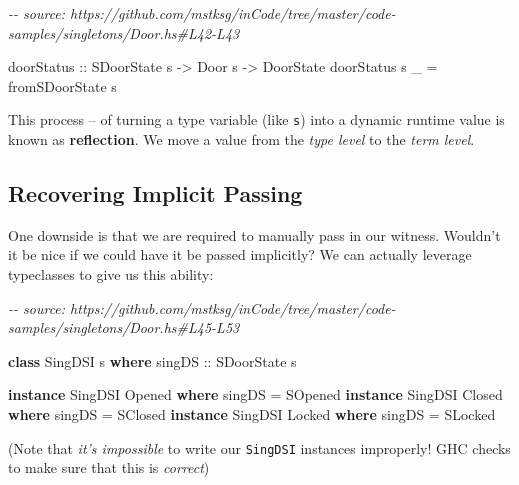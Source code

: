 \documentclass[]{article}
\newenvironment{Shaded}{}{}
\newcommand{\CommentTok}[1]{\textcolor[rgb]{0.38,0.63,0.69}{\textit{#1}}}
\newcommand{\DataTypeTok}[1]{\textcolor[rgb]{0.56,0.13,0.00}{#1}}
\newcommand{\KeywordTok}[1]{\textcolor[rgb]{0.00,0.44,0.13}{\textbf{#1}}}
\newcommand{\NormalTok}[1]{#1}
\newcommand{\OtherTok}[1]{\textcolor[rgb]{0.00,0.44,0.13}{#1}}
\begin{document}
\begin{Shaded}
\begin{Highlighting}[]
\CommentTok{{-}{-} source: https://github.com/mstksg/inCode/tree/master/code{-}samples/singletons/Door.hs\#L42{-}L43}

\OtherTok{doorStatus ::} \DataTypeTok{SDoorState}\NormalTok{ s }\OtherTok{{-}>} \DataTypeTok{Door}\NormalTok{ s }\OtherTok{{-}>} \DataTypeTok{DoorState}
\NormalTok{doorStatus s \_ }\OtherTok{=}\NormalTok{ fromSDoorState s}
\end{Highlighting}
\end{Shaded}

This process -- of turning a type variable (like \texttt{s}) into a dynamic
runtime value is known as \textbf{reflection}. We move a value from the
\emph{type level} to the \emph{term level}.

\hypertarget{recovering-implicit-passing}{%
\subsection{Recovering Implicit Passing}\label{recovering-implicit-passing}}

One downside is that we are required to manually pass in our witness. Wouldn't
it be nice if we could have it be passed implicitly? We can actually leverage
typeclasses to give us this ability:

\begin{Shaded}
\begin{Highlighting}[]
\CommentTok{{-}{-} source: https://github.com/mstksg/inCode/tree/master/code{-}samples/singletons/Door.hs\#L45{-}L53}

\KeywordTok{class} \DataTypeTok{SingDSI}\NormalTok{ s }\KeywordTok{where}
\OtherTok{    singDS ::} \DataTypeTok{SDoorState}\NormalTok{ s}

\KeywordTok{instance} \DataTypeTok{SingDSI} \DataTypeTok{\textquotesingle{}Opened} \KeywordTok{where}
\NormalTok{    singDS }\OtherTok{=} \DataTypeTok{SOpened}
\KeywordTok{instance} \DataTypeTok{SingDSI} \DataTypeTok{\textquotesingle{}Closed} \KeywordTok{where}
\NormalTok{    singDS }\OtherTok{=} \DataTypeTok{SClosed}
\KeywordTok{instance} \DataTypeTok{SingDSI} \DataTypeTok{\textquotesingle{}Locked} \KeywordTok{where}
\NormalTok{    singDS }\OtherTok{=} \DataTypeTok{SLocked}
\end{Highlighting}
\end{Shaded}

(Note that \emph{it's impossible} to write our \texttt{SingDSI} instances
improperly! GHC checks to make sure that this is \emph{correct})
\end{document}
